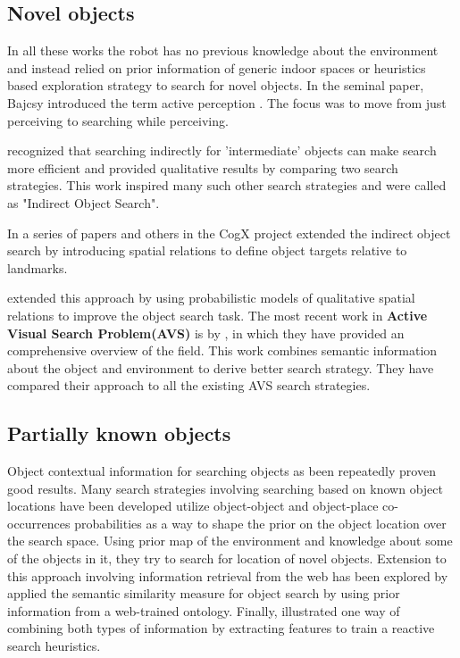 \subsection{Novel objects}
\label{sub:novel objects}
In all these works the robot has no previous knowledge about the environment and instead relied on prior information of generic indoor spaces or heuristics based exploration strategy to search for novel objects. 
In the seminal paper, Bajcsy introduced the term active perception \cite {bajcsy1988active}. The focus was to move from just perceiving to searching while perceiving.

\cite{wixson1994using} recognized that searching indirectly for 'intermediate' objects can make search more efficient and provided qualitative results by comparing two search strategies. This work inspired many such other search strategies and were called as "Indirect Object Search". 

In a series of papers \cite{aydemir_plan-based_2011} \cite{aydemir_exploiting_2012}and others in the CogX project 
extended the indirect object search by introducing spatial relations to define object targets relative to landmarks.

\cite{kunze_indirect_2014} extended this approach by using probabilistic models of qualitative spatial relations to improve the object search task.
The most recent work in \textbf{Active Visual Search Problem(AVS)} is by \cite{aydemir_active_2013}, in which they have provided an comprehensive overview of the field. This work combines semantic information about the object and environment to derive better search strategy. They have compared their approach to all the existing AVS search strategies.

\subsection{Partially known objects}
\label{sub:partially known objects}
Object contextual information for searching objects as been repeatedly proven good results. Many search strategies involving searching based on known object locations have been developed
\cite{kollar_utilizing_2009} utilize object-object and object-place co-occurrences probabilities as a way to shape the prior on the object location over the search space. Using prior map of the environment and knowledge about some of the objects in it, they try to search for location of novel objects.
Extension to this approach involving information retrieval from the web has been explored by \cite {samadi_using_2012}
\cite{kunze_searching_2012} applied the semantic similarity measure for object search by using prior information from a web-trained ontology.
Finally, \cite{joho_learning_2011} illustrated one way of combining both types of information by extracting features to train a reactive search heuristics.

